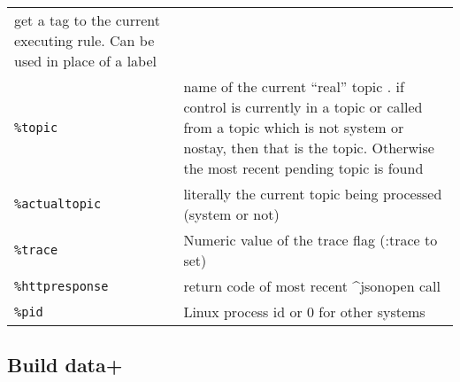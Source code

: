 \documentclass[]{article}
\begin{document}
\begin{longtable}[]{@{}ll@{}}
\begin{minipage}[t]{0.10\columnwidth}
get a tag to the current executing rule. Can be used in place of a
label\strut
\end{minipage}\tabularnewline
\begin{minipage}[t]{0.12\columnwidth}\raggedright\strut
\texttt{\%topic}\strut
\end{minipage} & \begin{minipage}[t]{0.10\columnwidth}\raggedright\strut
name of the current ``real'' topic . if control is currently in a topic
or called from a topic which is not system or nostay, then that is the
topic. Otherwise the most recent pending topic is found\strut
\end{minipage}\tabularnewline
\begin{minipage}[t]{0.12\columnwidth}\raggedright\strut
\texttt{\%actualtopic}\strut
\end{minipage} & \begin{minipage}[t]{0.10\columnwidth}\raggedright\strut
literally the current topic being processed (system or not)\strut
\end{minipage}\tabularnewline
\begin{minipage}[t]{0.12\columnwidth}\raggedright\strut
\texttt{\%trace}\strut
\end{minipage} & \begin{minipage}[t]{0.10\columnwidth}\raggedright\strut
Numeric value of the trace flag (:trace to set)\strut
\end{minipage}\tabularnewline
\begin{minipage}[t]{0.12\columnwidth}\raggedright\strut
\texttt{\%httpresponse}\strut
\end{minipage} & \begin{minipage}[t]{0.10\columnwidth}\raggedright\strut
return code of most recent \^{}jsonopen call\strut
\end{minipage}\tabularnewline
\begin{minipage}[t]{0.12\columnwidth}\raggedright\strut
\texttt{\%pid}\strut
\end{minipage} & \begin{minipage}[t]{0.10\columnwidth}\raggedright\strut
Linux process id or 0 for other systems\strut
\end{minipage}\tabularnewline
\bottomrule
\end{longtable}

\subsection{Build data+}\label{build-data}
\end{document}
